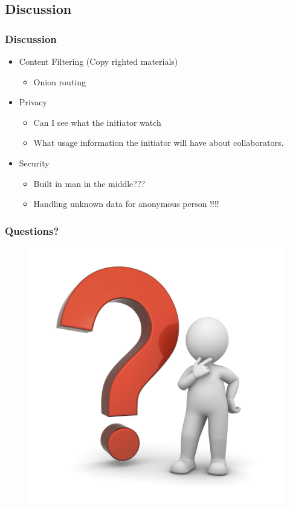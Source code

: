 \documentclass{beamer} %
\begin{document}
\subsection{Discussion}
\begin{frame}
\frametitle{Discussion}
\begin{itemize}
\item Content Filtering (Copy righted materials)
\begin{itemize}
\item Onion routing
\end{itemize}
\item Privacy
\begin{itemize}
\item Can I see what the initiator watch
\item What usage information the initiator will have about collaborators.
\end{itemize}
\item Security
\begin{itemize}
\item Built in man in the middle???
\item Handling unknown data for anonymous person !!!!
\end{itemize}
\end{itemize}
\end{frame}

\begin{frame}
\frametitle{Questions?}
\begin{figure}[hbtp]
\centering
\includegraphics[scale=.1]{figures/question-mark-nothing.jpg}
\end{figure}
\end{frame}
\end{document}
